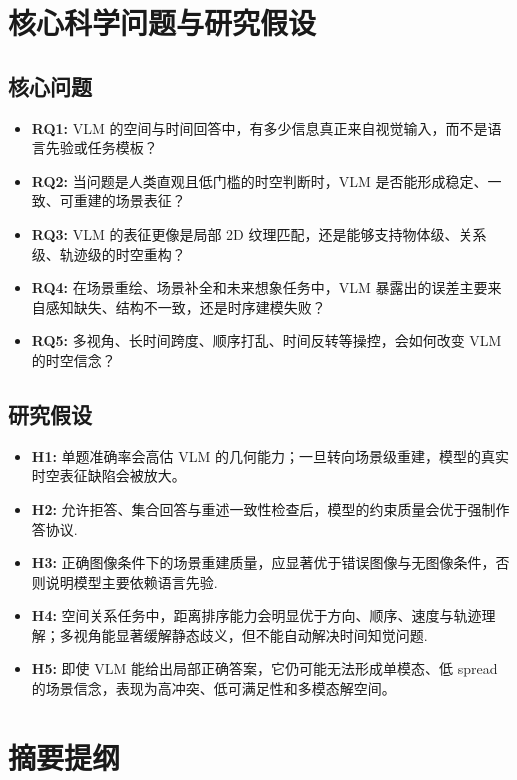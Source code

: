 \documentclass[UTF8,12pt,fontset=none]{ctexart}
\begin{document}
\section{核心科学问题与研究假设}

\subsection{核心问题}
\begin{itemize}
  \item \textbf{RQ1:} VLM 的空间与时间回答中，有多少信息真正来自视觉输入，而不是语言先验或任务模板？
  \item \textbf{RQ2:} 当问题是人类直观且低门槛的时空判断时，VLM 是否能形成稳定、一致、可重建的场景表征？
  \item \textbf{RQ3:} VLM 的表征更像是局部 2D 纹理匹配，还是能够支持物体级、关系级、轨迹级的时空重构？
  \item \textbf{RQ4:} 在场景重绘、场景补全和未来想象任务中，VLM 暴露出的误差主要来自感知缺失、结构不一致，还是时序建模失败？
  \item \textbf{RQ5:} 多视角、长时间跨度、顺序打乱、时间反转等操控，会如何改变 VLM 的时空信念？
\end{itemize}

\subsection{研究假设}
\begin{itemize}
  \item \textbf{H1:} 单题准确率会高估 VLM 的几何能力；一旦转向场景级重建，模型的真实时空表征缺陷会被放大。
  \item \textbf{H2:} 允许拒答、集合回答与重述一致性检查后，模型的约束质量会优于强制作答协议\cite{whitehead2022reliablevqa,eisenschlos2024selectivevqa,khan2024consistency}.
  \item \textbf{H3:} 正确图像条件下的场景重建质量，应显著优于错误图像与无图像条件，否则说明模型主要依赖语言先验\cite{lee2025vlind,chen2024mmstar}.
  \item \textbf{H4:} 空间关系任务中，距离排序能力会明显优于方向、顺序、速度与轨迹理解；多视角能显著缓解静态歧义，但不能自动解决时间知觉问题\cite{chen2024spatialvlm,fu2024blink}.
  \item \textbf{H5:} 即使 VLM 能给出局部正确答案，它仍可能无法形成单模态、低 spread 的场景信念，表现为高冲突、低可满足性和多模态解空间。
\end{itemize}

\section{摘要提纲}
\end{document}

